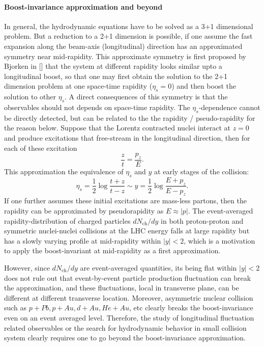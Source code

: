 \paragraph{Boost-invariance approximation and beyond}
In general, the hydrodynamic equations have to be solved as a 3+1 dimensional problem.
But a reduction to a 2+1 dimension is possible, if one assume the fast expansion along the beam-axis (longitudinal) direction has an approximated symmetry near mid-rapidity.
This approximate symmetry is first proposed by Bjorken in [] that the system at different rapidity looks similar upto a longitudinal boost, so that one may first obtain the solution to the 2+1 dimension problem at one space-time rapidity ($\eta_s = 0$) and then boost the solution to other $\eta_s$.
A direct consequences of this symmetry is that the observables should not depends on space-time rapidity.
The $\eta_s$-dependence cannot be directly detected, but can be related to the the rapidity / pseudo-rapidity for the reason below.
Suppose that the Lorentz contracted nuclei interact at $z=0$ and produce excitations that free-stream in the longitudinal direction, then for each of these excitation
\begin{equation}
  \frac{z}{t} = \frac{p_z}{E}.
\end{equation}
This approximation the equivalence of $\eta_s$ and $y$ at early stages of the collision:
\begin{equation}
  \eta_s = \frac{1}{2}\log\frac{t+z}{t-z} \sim y = \frac{1}{2}\log\frac{E+p_z}{E-p_z}.
\end{equation}
If one further assumes these initial excitations are mass-less partons, then the rapidity can be approximated by pseudorapidity as $E\approx |p|$.
The event-averaged rapidity-distribution of charged particles $dN_{\textrm{ch}}/dy$ in both proton-proton and symmetric nuclei-nuclei collisions at the LHC energy falls at large rapidity but has a slowly varying profile at mid-rapidity within $|y|<2$, which is a motivation to apply the boost-invariant at mid-rapidity as a first approximation.

However, since $dN_{\textrm{ch}}/dy$ are event-averaged quantities, its being flat within $|y|<2$ does not rule out that event-by-event particle production fluctuation can break the approximation, and these fluctuations, local in transverse plane, can be different at different transverse location.
Moreover, asymmetric nuclear collision such as $p+Pb, p+Au, d+Au, He+Au$, etc clearly breaks the boost-invariance even on an event averaged level. 
Therefore, the study of longitudinal fluctuation related observables or the search for hydrodynamic  behavior in small collision system clearly requires one to go beyond the boost-invariance approximation.

